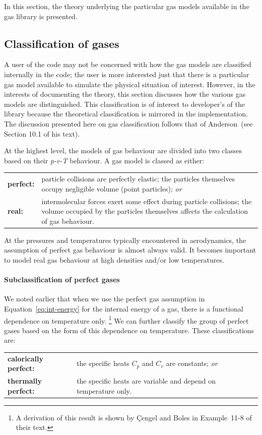In this section, the theory underlying the particular gas models available in the
gas library is presented.

\subsection{Classification of gases}
A user of the code may not be concerned with how the gas models are classified
internally in the code; the user is more interested just that there is a particular
gas model available to simulate the physical situation of interest.
However, in the interests of documenting the theory, this section discusses how
the various gas models are distinguished.
This classification is of interest to developer's of the library because
the theoretical classification is mirrored in the implementation.
The discussion presented here on gas classification follows that of
Anderson~\cite{anderson_1990}(see Section 10.1 of his text).

At the highest level, the models of gas behaviour are divided into
two classes based on their \textit{p-v-T} behaviour.
A gas model is classed as either:\\
\begin{tabular}{lp{12cm}}
\textbf{perfect:} & particle collisions are perfectly elastic;
                   the particles themselves occupy negligible volume (point particles); \emph{or} \\
\textbf{real:} & intermolecular forces exert some effect during particle collisions;
                the volume occupied by the particles themselves affects the calculation of gas behaviour.
\end{tabular}
At the pressures and temperatures typically encountered in aerodynamics, the assumption of perfect
gas behaviour is almost always valid.
It becomes important to model real gas behaviour at high densities and/or low temperatures.

\paragraph{Subclassification of perfect gases}
We noted earlier that when we use the perfect gas assumption in Equation~\ref{eq:int-energy}
for the internal energy of a gas, there is a functional dependence on temperature only.
\footnote{A derivation of this result is shown by \c{C}engel and Boles in
Example~11-8 of their text.}
We can further classify the group of perfect gases based on the form of this dependence on temperature.
These classifications are:\\
\begin{tabular}{lp{12cm}}
\textbf{calorically perfect:} & the specific heats $C_p$ and $C_v$ are constants; \emph{or} \\
\textbf{thermally perfect:} & the specific heats are variable and depend on temperature only.
\end{tabular}

